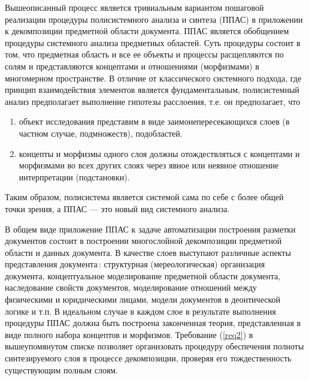 \documentclass[utf8]{../IncArticle}
\begin{document}
Вышеописанный процесс является тривиальным вариантом пошаговой
реализации процедуры полисистемного анализа и синтеза \cite{father}
(ППАС) в приложении к декомпозиции предметной области документа. ППАС
является обобщением процедуры системного анализа предметных областей.
Суть процедуры состоит в том, что предметная область и все ее объекты
и процессы расщепляются по солям и представляются концептами и
отношениями (морфизмами) в многомерном пространстве.  В отличие от
классического системного подхода, где принцип взаимодействия элементов
является фундаментальным, полисистемный анализ предполагает выполнение
гипотезы расслоения, т.е. он предполагает, что
\begin{enumerate}
\item объект исследования представим в виде заимонепересекающихся
  слоев (в частном случае, подмножеств), подобластей. \label{req1}
\item концепты и морфизмы одного слоя должны отождествляться с
  концептами и морфизмами во всех других слоях через явное или неявное
  отношение интерпретации (подстановки). \label{req2}
\end{enumerate}
Таким образом, полисистема является системой сама по себе с более
общей точки зрения, а ППАС --- это новый вид системного анализа.

В общем виде приложение ППАС к задаче автоматизации построения
разметки документов состоит в построении многослойной декомпозиции
предметной области и данных документа. В качестве слоев выступают
различные аспекты представления документа\,: структурная
(мереологическая) организация документа, концептуальное моделирование
предметной области документа, наследование свойств документов,
моделирование отношений между физическими и юридическими лицами,
модели документов в деонтической логике и т.п.  В идеальном случае в
каждом слое в результате выполнения процедуры ППАС должна быть
построена законченная теория, представленная в виде полного набора
концептов и морфизмов.  Требование (\ref{req2}) в вышеупомянутом
списке позволяет организовать процедуру обеспечения полноты
синтезируемого слоя в процессе декомпозиции, проверяя его
тождественность существующим полным слоям.

\end{document}
